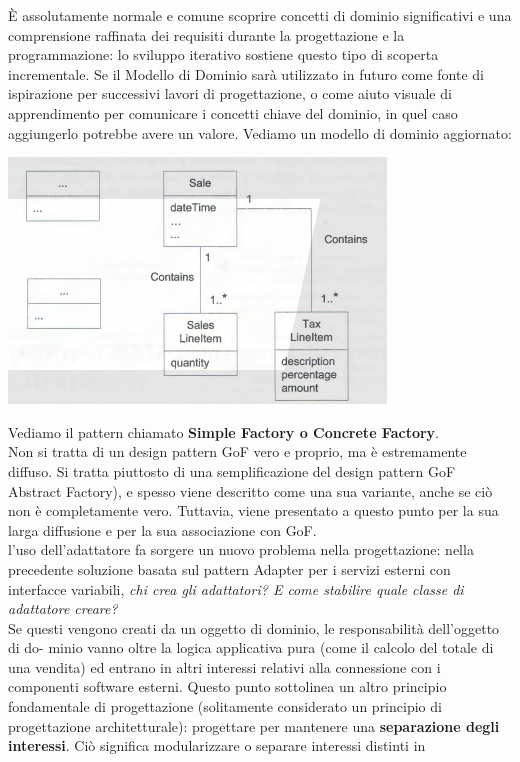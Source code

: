 \documentclass[a4paper,12pt, oneside]{book}
\begin{document}
È assolutamente normale e comune scoprire concetti di dominio
significativi e una comprensione raffinata dei requisiti durante la progettazione e la programmazione: lo sviluppo iterativo sostiene questo tipo di scoperta incrementale.
Se il
Modello di Dominio sarà utilizzato in futuro come fonte di ispirazione per successivi lavori di progettazione, o come aiuto visuale di apprendimento per comunicare i concetti
chiave del dominio, in quel caso aggiungerlo potrebbe avere un valore. Vediamo un modello di dominio aggiornato:
\begin{center}
\includegraphics[scale = 0.7]{img/gof5.png}
\end{center}
Vediamo il pattern chiamato \textbf{Simple Factory o Concrete Factory}.\\
Non si tratta di
un design pattern GoF vero e proprio, ma è estremamente diffuso. Si tratta piuttosto di
una semplificazione del design pattern GoF Abstract Factory), e spesso
viene descritto come una sua variante, anche se ciò non è completamente vero. Tuttavia,
viene presentato a questo punto per la sua larga diffusione e per la sua associazione con
GoF.\\
l'uso dell'adattatore fa sorgere un nuovo problema nella progettazione: nella precedente
soluzione basata sul pattern Adapter per i servizi esterni con interfacce variabili,\textit{ chi crea
  gli adattatori? E come stabilire quale classe di adattatore creare?}\\
Se questi vengono creati da un oggetto di dominio, le responsabilità dell'oggetto di do-
minio vanno oltre la logica applicativa pura (come il calcolo del totale di una vendita) ed
entrano in altri interessi relativi alla connessione con i componenti software esterni.
Questo punto sottolinea un altro principio fondamentale di progettazione (solitamente
considerato un principio di progettazione architetturale): progettare per mantenere una
\textbf{separazione degli interessi}. Ciò significa modularizzare o separare interessi distinti in
\end{document}
